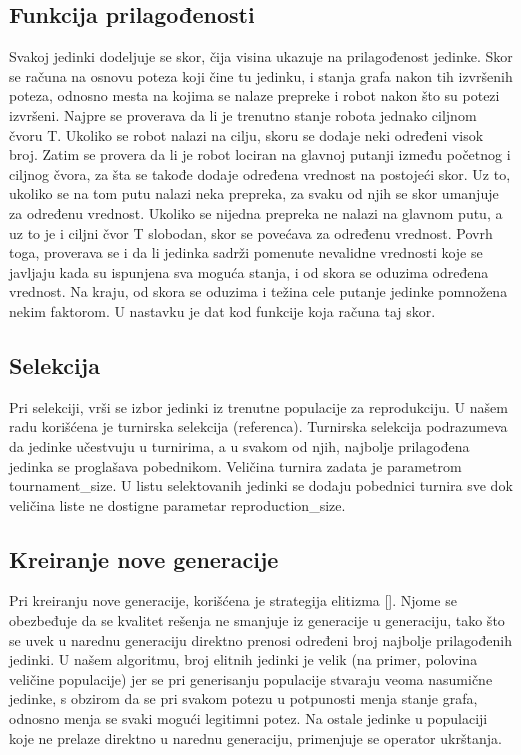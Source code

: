 \documentclass[12pt]{article}
\begin{document}
	
	\subsection{Funkcija prilagođenosti}
	\label{sec:drugoPoglavlje}
	Svakoj jedinki dodeljuje se skor, čija visina ukazuje na prilagođenost jedinke. Skor se računa na osnovu poteza koji čine tu jedinku, i stanja grafa nakon tih izvršenih poteza, odnosno mesta na kojima se nalaze prepreke i robot nakon što su potezi izvršeni. Najpre se proverava da li je trenutno stanje robota jednako ciljnom čvoru T. Ukoliko se robot nalazi na cilju, skoru se dodaje neki određeni visok broj. Zatim se provera da li je robot lociran na glavnoj putanji između početnog i ciljnog čvora, za šta se takođe dodaje određena vrednost na postojeći skor. Uz to, ukoliko se na tom putu nalazi neka prepreka, za svaku od njih se skor umanjuje za određenu vrednost. Ukoliko se nijedna prepreka ne nalazi na glavnom putu, a uz to je i ciljni čvor T slobodan, skor se povećava za određenu vrednost. Povrh toga, proverava se i da li jedinka sadrži pomenute nevalidne vrednosti koje se javljaju kada su ispunjena sva moguća stanja, i od skora se oduzima određena vrednost. Na kraju, od skora se oduzima i težina cele putanje jedinke pomnožena nekim faktorom. U nastavku je dat kod funkcije koja računa taj skor.
	
	
	
	\subsection{Selekcija}	
	Pri selekciji, vrši se izbor jedinki iz trenutne populacije za reprodukciju. U našem radu korišćena je turnirska selekcija (referenca). Turnirska selekcija podrazumeva da jedinke učestvuju u turnirima, a u svakom od njih, najbolje prilagođena jedinka se proglašava pobednikom. Veličina turnira zadata je parametrom tournament\_size. U listu selektovanih jedinki se dodaju pobednici turnira sve dok veličina liste ne dostigne parametar reproduction\_size. 
	\newpage
		
	
	
	\subsection{Kreiranje nove generacije}	
	\label{sec:trecePoglavlje}
	
	Pri kreiranju nove generacije, korišćena je strategija elitizma []. Njome se obezbeđuje da se kvalitet rešenja ne smanjuje iz generacije u generaciju, tako što se uvek u narednu generaciju direktno prenosi određeni broj najbolje prilagođenih jedinki. U našem algoritmu, broj elitnih jedinki je velik (na primer, polovina veličine populacije) jer se pri generisanju populacije stvaraju veoma nasumične jedinke, s obzirom da se pri svakom potezu u potpunosti menja stanje grafa, odnosno menja se svaki mogući legitimni potez. Na ostale jedinke u populaciji koje ne prelaze direktno u narednu generaciju, primenjuje se operator ukrštanja.
	
	
\end{document}
